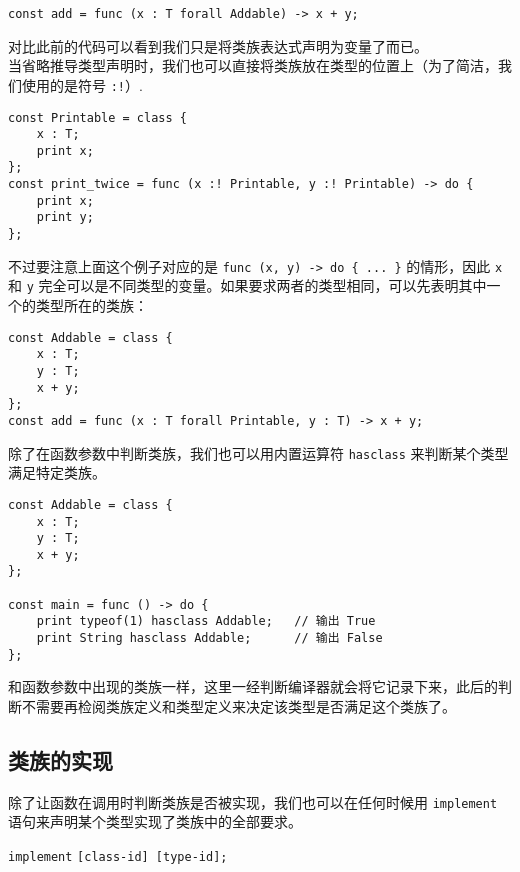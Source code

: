 \begin{lstlisting}
const add = func (x : T forall Addable) -> x + y;
\end{lstlisting}

对比此前的代码可以看到我们只是将类族表达式声明为变量了而已。 \\

当省略推导类型声明时，我们也可以直接将类族放在类型的位置上（为了简洁，我们使用的是符号 \lstinline|:!|）.

\begin{lstlisting}
const Printable = class {
	x : T;
	print x;
};
const print_twice = func (x :! Printable, y :! Printable) -> do {
	print x;
	print y;
};
\end{lstlisting}

不过要注意上面这个例子对应的是 \lstinline!func (x, y) -> do { ... }! 的情形，因此 \lstinline!x! 和 \lstinline!y! 完全可以是不同类型的变量。如果要求两者的类型相同，可以先表明其中一个的类型所在的类族：

\begin{lstlisting}
const Addable = class { 
	x : T;
	y : T;
	x + y;
};
const add = func (x : T forall Printable, y : T) -> x + y;
\end{lstlisting}

除了在函数参数中判断类族，我们也可以用内置运算符 \lstinline!hasclass! 来判断某个类型满足特定类族。

\begin{lstlisting}
const Addable = class {
	x : T;
	y : T;
	x + y;
};

const main = func () -> do {
	print typeof(1) hasclass Addable;	// 输出 True
	print String hasclass Addable;		// 输出 False
};
\end{lstlisting}

和函数参数中出现的类族一样，这里一经判断编译器就会将它记录下来，此后的判断不需要再检阅类族定义和类型定义来决定该类型是否满足这个类族了。

\subsection{类族的实现}

除了让函数在调用时判断类族是否被实现，我们也可以在任何时候用 \lstinline!implement! 语句来声明某个类型实现了类族中的全部要求。

\begin{grammar} \label{grm:implement-statement}
	\lstinline!implement! \texttt{[class-id] [type-id];}
\end{grammar}

